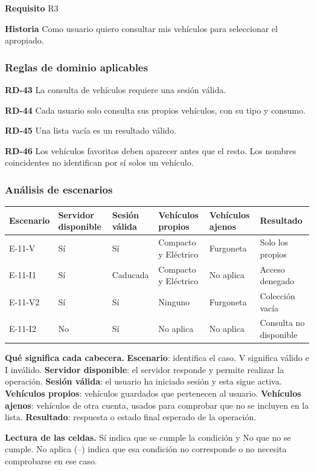 \textbf{Requisito} R3\par

\textbf{Historia} Como usuario quiero consultar mis vehículos para seleccionar el apropiado.\par

\subsubsection*{Reglas de dominio aplicables}

\textbf{RD-43} La consulta de vehículos requiere una sesión válida.\par

\textbf{RD-44} Cada usuario solo consulta sus propios vehículos, con su tipo y consumo.\par

\textbf{RD-45} Una lista vacía es un resultado válido.\par

\textbf{RD-46} Los vehículos favoritos deben aparecer antes que el resto. Los nombres coincidentes no identifican por sí solos un vehículo.\par

\subsubsection*{Análisis de escenarios}

\begingroup\fontsize{7.8}{11}\selectfont\setlength{\tabcolsep}{3pt}
\begin{tabularx}{\linewidth}{@{}*{6}{Y}@{}}\toprule
\textbf{Escenario} & \textbf{Servidor disponible} & \textbf{Sesión válida} & \textbf{Vehículos propios} & \textbf{Vehículos ajenos} & \textbf{Resultado}\\\midrule
E-11-V & Sí & Sí & Compacto y Eléctrico & Furgoneta & Solo los propios\\[3pt]
E-11-I1 & Sí & Caducada & Compacto y Eléctrico & No aplica & Acceso denegado\\[3pt]
E-11-V2 & Sí & Sí & Ninguno & Furgoneta & Colección vacía\\[3pt]
E-11-I2 & No & Sí & No aplica & No aplica & Consulta no disponible\\[3pt]
\bottomrule\end{tabularx}\endgroup\par
{\fontsize{9}{11}\selectfont\textbf{Qué significa cada cabecera.} \textbf{Escenario}: identifica el caso. V significa válido e I inválido. \textbf{Servidor disponible}: el servidor responde y permite realizar la operación. \textbf{Sesión válida}: el usuario ha iniciado sesión y esta sigue activa. \textbf{Vehículos propios}: vehículos guardados que pertenecen al usuario. \textbf{Vehículos ajenos}: vehículos de otra cuenta, usados para comprobar que no se incluyen en la lista. \textbf{Resultado}: respuesta o estado final esperado de la operación.\par\textbf{Lectura de las celdas.} Sí indica que se cumple la condición y No que no se cumple. No aplica (--) indica que esa condición no corresponde o no necesita comprobarse en ese caso.\par}


